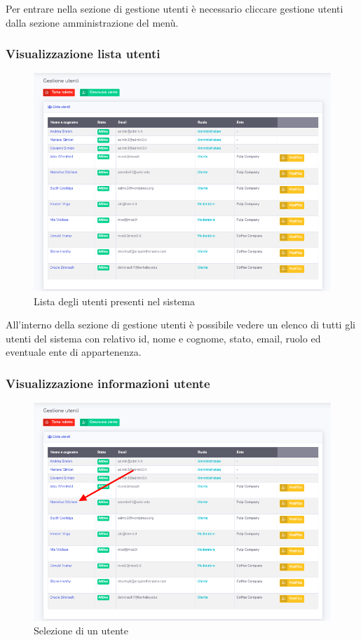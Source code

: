 		Per entrare nella sezione di gestione utenti è necessario cliccare gestione utenti dalla sezione amministrazione del menù. 

	\subsubsection{Visualizzazione lista utenti}	
		\begin{figure}[H]
		\centering
		\includegraphics[scale=0.600]{res/images/admin/listaUtenti.png}
		\caption{Lista degli utenti presenti nel sistema}
	\end{figure}

		All'interno della sezione di gestione utenti è possibile vedere un elenco di tutti gli utenti del sistema con relativo id, nome e cognome, stato, email, ruolo ed eventuale ente di appartenenza. 

	\subsubsection{Visualizzazione informazioni utente}	

		\begin{figure}[H]
		\centering
		\includegraphics[scale=0.600]{res/images/admin/selDettUtente.png}
		\caption{Selezione di un utente}
	\end{figure}

